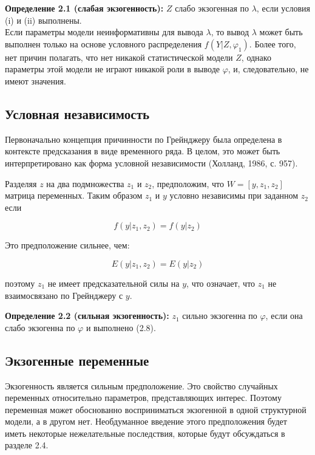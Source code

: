 {\bf Определение 2.1 (слабая экзогенность):}  $Z$ слабо экзогенная по $\lambda$, если условия (i) и (ii) выполнены.\\
	Если параметры модели неинформативны для вывода $\lambda$, то вывод $\lambda $  может быть выполнен только на основе условного распределения $f(Y|Z,\varphi_{1})$. Более того, нет причин полагать, что нет никакой статистической модели $Z$, однако параметры этой модели не играют никакой роли в выводе $\varphi$, и, следовательно, не имеют значения. \\


\subsection{Условная независимость}


Первоначально концепция причинности по Грейнджеру была определена в контексте предсказания в виде временного ряда. В целом, это может быть интерпретировано как форма условной независимости (Холланд, 1986, с. 957). 


	Разделяя $z$ на два подмножества $z_{1}$ и $z_{2}$, предположим, что $W=[y,z_{1},z_{2}]$ матрица переменных. Таким образом $z_{1}$ и $y$ условно независимы при заданном $z_{2}$ если

\begin{equation}
f(y|z_{1},z_{2})=f(y|z_{2})
\end{equation}

Это предположение сильнее, чем:
 
\begin{equation}
E(y|z_{1},z_{2})=E(y|z_{2})
\end{equation}

поэтому $z_{1}$ не имеет предсказательной силы на $y$, что означает, что $z_{1}$ не взаимосвязано по Грейнджеру с $y$.

{\bf Определение 2.2 (сильная экзогенность):}  $z_{1}$ сильно экзогенна по $\varphi$, если она слабо экзогенна по $\varphi$ и выполнено (2.8).

\subsection{Экзогенные переменные}


	Экзогенность является сильным предположение. Это свойство случайных переменных относительно параметров, представляющих интерес. Поэтому переменная может обоснованно восприниматься экзогенной в одной структурной модели, а в другом нет. Необдуманное введение этого предположения будет иметь некоторые нежелательные последствия, которые будут обсуждаться в разделе 2.4. 
	
